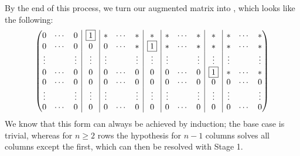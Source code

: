 \documentclass[main.tex]{subfiles}
\begin{document}
By the end of this process, we turn our augmented matrix into , which looks like the following:
\[\left(\begin{array}{@{}c c c | c | c c c | c | c c c | c | c c c@{}}
    0 & \cdots & 0 & \boxed{1} & * & \cdots & * & * & * & \cdots & * & * & * & \cdots & *  \\
    0 & \cdots & 0 & 0 & 0 & \cdots & * & \boxed{1} & * & \cdots & * & * & * & \cdots & *  \\
    \vdots & & \vdots & \vdots & \vdots & & \vdots & \vdots & \vdots & & \vdots & \vdots & \vdots & & \vdots \\
    0 & \cdots & 0 & 0 & 0 & \cdots & 0 & 0 & 0 & \cdots & 0 & \boxed{1} & * & \cdots & *  \\
    0 & \cdots & 0 & 0 & 0 & \cdots & 0 & 0 & 0 & \cdots & 0 & 0 & 0 & \cdots & 0  \\
    \vdots & & \vdots & \vdots & \vdots & & \vdots & \vdots & \vdots & & \vdots & \vdots & \vdots & & \vdots \\
    0 & \cdots & 0 & 0 & 0 & \cdots & 0 & 0 & 0 & \cdots & 0 & 0 & 0 & \cdots & 0
\end{array}\right)\]
We know that this form can always be achieved by induction; the base case is trivial, whereas for $n\ge 2$ rows the hypothesis for $n - 1$ columns solves all columns except the first, which can then be resolved with Stage 1.
\end{document}
